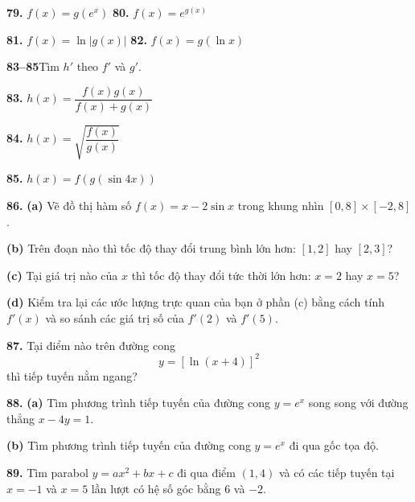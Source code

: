 \begin{minipage}[t]{0.485\textwidth}
    \noindent\textbf{79.} $f(x) = g(e^x)$ \hfill \textbf{80.} $f(x) = e^{g(x)}$
    \par\smallskip
    \noindent\textbf{81.} $f(x) = \ln |g(x)|$ \hfill \textbf{82.} $f(x) = g(\ln x)$

    \par\medskip
    \noindent\textbf{\textsf{\color{stewartcyan}83--85}}\quad Tìm $h'$ theo $f'$ và $g'$.
    \par\smallskip
    \noindent\textbf{83.} $h(x) = \dfrac{f(x)g(x)}{f(x) + g(x)}$
    \par\smallskip
    \noindent\textbf{84.} $h(x) = \sqrt{\dfrac{f(x)}{g(x)}}$
    \par\smallskip
    \noindent\textbf{85.} $h(x) = f(g(\sin 4x))$

    \par\medskip
    \noindent\llap{\graphingicon\hspace{5pt}}\textbf{86.} \textbf{(a)} Vẽ đồ thị hàm số $f(x) = x - 2\sin x$ trong khung nhìn $[0, 8] \times [-2, 8]$.
    \par\smallskip
    \noindent\hspace*{1.4em}\textbf{(b)} Trên đoạn nào thì tốc độ thay đổi trung bình lớn hơn: $[1, 2]$ hay $[2, 3]$?
    \par\smallskip
    \noindent\hspace*{1.4em}\textbf{(c)} Tại giá trị nào của $x$ thì tốc độ thay đổi tức thời lớn hơn: $x = 2$ hay $x = 5$?
    \par\smallskip
    \noindent\hspace*{1.4em}\textbf{(d)} Kiểm tra lại các ước lượng trực quan của bạn ở phần (c) bằng cách tính $f'(x)$ và so sánh các giá trị số của $f'(2)$ và $f'(5)$.

    \par\medskip
    \noindent\textbf{87.} Tại điểm nào trên đường cong
    \[
    y = [\ln(x + 4)]^2
    \]
    thì tiếp tuyến nằm ngang?

    \par\medskip
    \noindent\textbf{88.} \textbf{(a)} Tìm phương trình tiếp tuyến của đường cong $y = e^x$ song song với đường thẳng $x - 4y = 1$.
    \par\smallskip
    \noindent\hspace*{1.4em}\textbf{(b)} Tìm phương trình tiếp tuyến của đường cong $y = e^x$ đi qua gốc tọa độ.

    \par\medskip
    \noindent\textbf{89.} Tìm parabol $y = ax^2 + bx + c$ đi qua điểm $(1, 4)$ và có các tiếp tuyến tại $x = -1$ và $x = 5$ lần lượt có hệ số góc bằng $6$ và $-2$.


\end{minipage}
